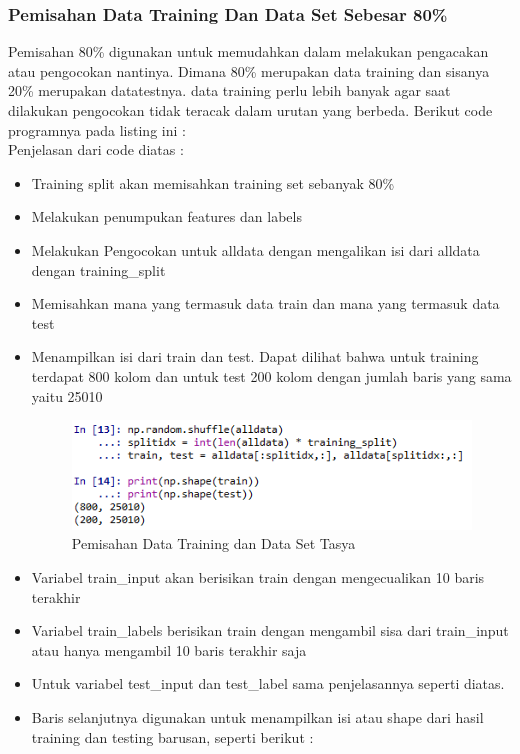 \subsubsection{Pemisahan Data Training Dan Data Set Sebesar 80\%}
\par Pemisahan 80\% digunakan untuk memudahkan dalam melakukan pengacakan atau pengocokan nantinya. Dimana 80\% merupakan data training dan sisanya 20\% merupakan datatestnya. data training perlu lebih banyak agar saat dilakukan pengocokan tidak teracak dalam urutan yang berbeda. Berikut code programnya pada listing ini :\\

Penjelasan dari code diatas :
\begin{itemize}
\item Training split akan memisahkan training set sebanyak 80\%
\item Melakukan penumpukan features dan labels
\item Melakukan Pengocokan untuk alldata dengan mengalikan isi dari alldata dengan training\_split
\item Memisahkan mana yang termasuk data train dan mana yang termasuk data test
\item Menampilkan isi dari train dan test. Dapat dilihat bahwa untuk training terdapat 800 kolom dan untuk test 200 kolom dengan jumlah baris yang sama yaitu 25010
\begin{figure}[ht]
\centering
\includegraphics[scale=0.5]{figures/chapter6tasya15.png}
\caption{Pemisahan Data Training dan Data Set Tasya}
\label{Praktek}
\end{figure}
\item Variabel train\_input akan berisikan train dengan mengecualikan 10 baris terakhir
\item Variabel train\_labels berisikan train dengan mengambil sisa dari train\_input atau hanya mengambil 10 baris terakhir saja
\item Untuk variabel test\_input dan test\_label sama penjelasannya seperti diatas.
\item Baris selanjutnya digunakan untuk menampilkan isi atau shape dari hasil training dan testing barusan, seperti berikut :

\end{itemize}
